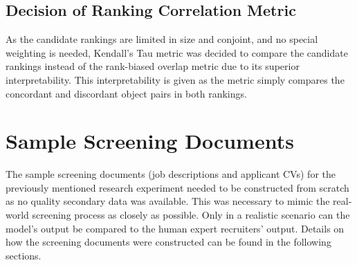 \documentclass[draft,final]{thesisclass} %
\begin{document}
\subsection{Decision of Ranking Correlation Metric}
As the candidate rankings are limited in size and conjoint, and no special weighting is needed, Kendall's Tau metric was decided to compare the candidate rankings instead of the rank-biased overlap metric due to its superior interpretability. This interpretability is given as the metric simply compares the concordant and discordant object pairs in both rankings.

\section{Sample Screening Documents} \label{sample_screening_documents}
The sample screening documents (job descriptions and applicant \acs{CV}s) for the previously mentioned research experiment needed to be constructed from scratch as no quality secondary data was available.
This was necessary to mimic the real-world screening process as closely as possible.
Only in a realistic scenario can the model's output be compared to the human expert recruiters' output.
Details on how the screening documents were constructed can be found in the following sections.
\end{document}
